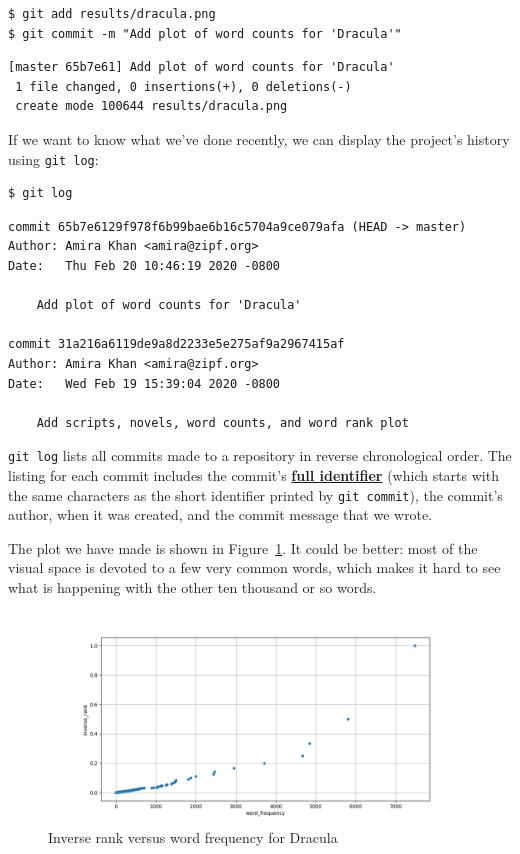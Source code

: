 \documentclass[
]{krantz}
\newcommand{\gref}[2]{\hyperlink{#2}{\textbf{#1}}}
\begin{document}
\begin{verbatim}
$ git add results/dracula.png
$ git commit -m "Add plot of word counts for 'Dracula'"
\end{verbatim}

\begin{verbatim}
[master 65b7e61] Add plot of word counts for 'Dracula'
 1 file changed, 0 insertions(+), 0 deletions(-)
 create mode 100644 results/dracula.png
\end{verbatim}

If we want to know what we've done recently,
we can display the project's history using \texttt{git\ log}:

\begin{verbatim}
$ git log
\end{verbatim}

\begin{verbatim}
commit 65b7e6129f978f6b99bae6b16c5704a9ce079afa (HEAD -> master)
Author: Amira Khan <amira@zipf.org>
Date:   Thu Feb 20 10:46:19 2020 -0800

    Add plot of word counts for 'Dracula'

commit 31a216a6119de9a8d2233e5e275af9a2967415af
Author: Amira Khan <amira@zipf.org>
Date:   Wed Feb 19 15:39:04 2020 -0800

    Add scripts, novels, word counts, and word rank plot
\end{verbatim}

\texttt{git\ log} lists all commits made to a repository in reverse chronological order.
The listing for each commit includes
the commit's \gref{full identifier}{full\_identifier\_git}
(which starts with the same characters as the short identifier printed by \texttt{git\ commit}),
the commit's author,
when it was created,
and the commit message that we wrote.

The plot we have made is shown in Figure~\ref{fig:git-cmdline-initial-plot}.
It could be better:
most of the visual space is devoted to a few very common words,
which makes it hard to see what is happening with the other ten thousand or so words.

\begin{figure}

{\centering \includegraphics[width=1\linewidth]{figures/git-cmdline/plot-initial} 

}

\caption{Inverse rank versus word frequency for Dracula}\label{fig:git-cmdline-initial-plot}
\end{figure}
\end{document}
